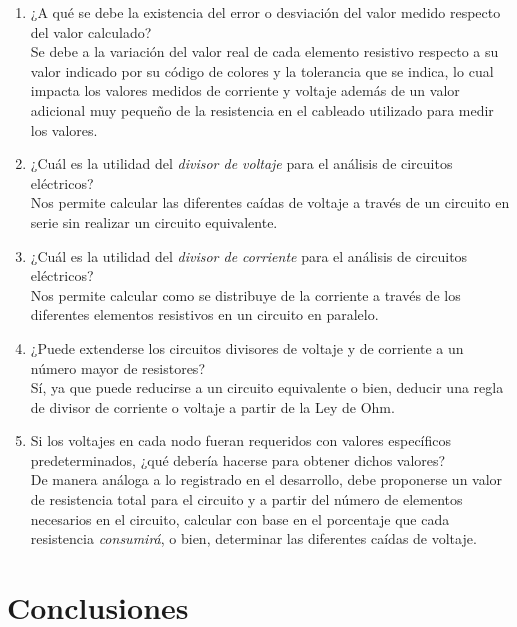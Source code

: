 \documentclass[a4paper,12pt]{article}
\begin{document}
\begin{enumerate}

\item ¿A qué se debe la existencia del error o desviación del valor medido respecto del valor calculado?\\
Se debe a la variación del valor real de cada elemento resistivo respecto a su valor indicado por su código de colores y la tolerancia que se indica, lo cual impacta los valores medidos de corriente y voltaje además de un valor adicional muy pequeño de la resistencia en el cableado utilizado para medir los valores.

\item ¿Cuál es la utilidad del \textit{divisor de voltaje} para el análisis de circuitos eléctricos?\\
Nos permite calcular las diferentes caídas de voltaje a través de un circuito en serie sin realizar un circuito equivalente.

\item ¿Cuál es la utilidad del \textit{divisor de corriente} para el análisis de circuitos eléctricos?\\
Nos permite calcular como se distribuye de la corriente a través de los diferentes elementos resistivos en un circuito en paralelo.

\item ¿Puede extenderse los circuitos divisores de  voltaje y de corriente a un número mayor de resistores?\\
Sí, ya que puede reducirse a un circuito equivalente o bien, deducir una regla de divisor de corriente o voltaje a partir de la Ley de Ohm.

\item Si los voltajes en cada nodo fueran requeridos con valores específicos predeterminados, ¿qué debería hacerse para obtener dichos valores?\\
De manera análoga a lo registrado en el desarrollo, debe proponerse un valor de resistencia total para el circuito y a partir del número de elementos necesarios en el circuito, calcular con base en el porcentaje que cada resistencia \emph{consumirá}, o bien, determinar las diferentes caídas de voltaje.

\end{enumerate}

\newpage

\section{Conclusiones}
\end{document}
